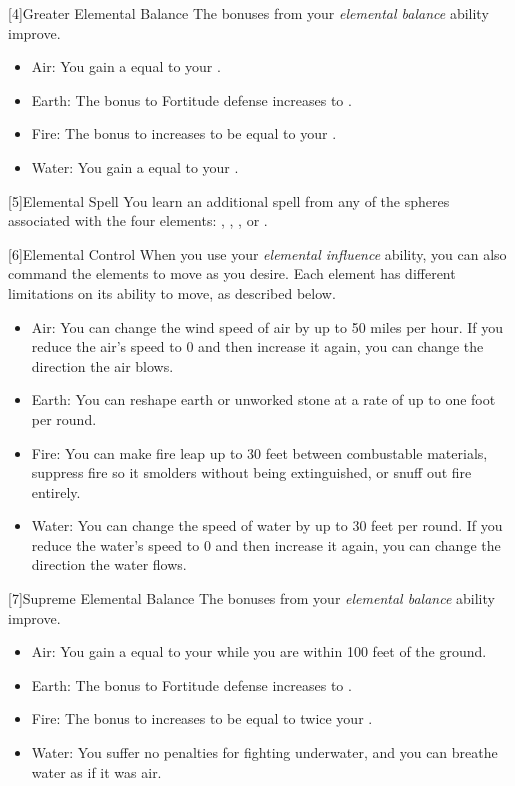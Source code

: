         [4]{Greater Elemental Balance} The bonuses from your \textit{elemental balance} ability improve.
        \begin{itemize}
            \item Air: You gain a  equal to your .
            \item Earth: The bonus to Fortitude defense increases to .
            \item Fire: The bonus to  increases to be equal to your .
            \item Water: You gain a  equal to your .
        \end{itemize}

        [5]{Elemental Spell} You learn an additional spell from any of the spheres associated with the four elements: , , , or .

        [6]{Elemental Control} When you use your \textit{elemental influence} ability, you can also command the elements to move as you desire.
        Each element has different limitations on its ability to move, as described below.
        \begin{itemize}
            \item Air: You can change the wind speed of air by up to 50 miles per hour.
                If you reduce the air's speed to 0 and then increase it again, you can change the direction the air blows.
            \item Earth: You can reshape earth or unworked stone at a rate of up to one foot per round.
            \item Fire: You can make fire leap up to 30 feet between combustable materials, suppress fire so it smolders without being extinguished, or snuff out fire entirely.
            \item Water: You can change the speed of water by up to 30 feet per round.
                If you reduce the water's speed to 0 and then increase it again, you can change the direction the water flows.
        \end{itemize}

        [7]{Supreme Elemental Balance} The bonuses from your \textit{elemental balance} ability improve.
        \begin{itemize}
            \item Air: You gain a  equal to your  while you are within 100 feet of the ground.
            \item Earth: The bonus to Fortitude defense increases to .
            \item Fire: The bonus to  increases to be equal to twice your .
            \item Water: You suffer no penalties for fighting underwater, and you can breathe water as if it was air.
        \end{itemize}

